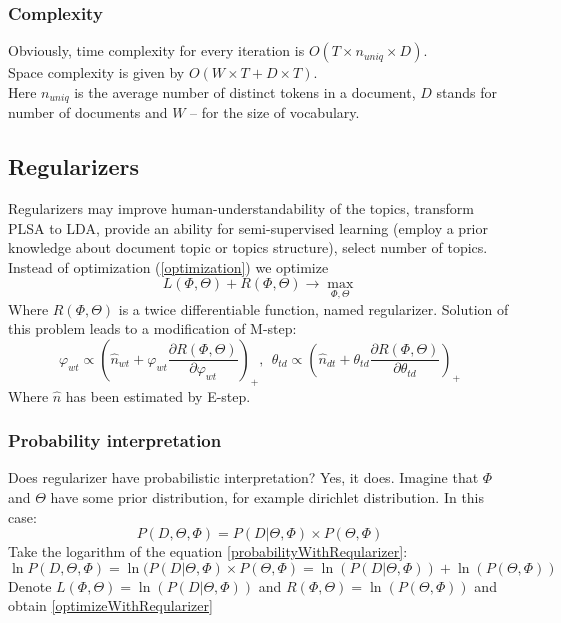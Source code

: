     \subsubsection*{Complexity}
    Obviously, time complexity for every iteration is $O(T \times n_{uniq} \times D)$.\\
    Space complexity is given by $O(W \times T + D \times T)$.\\
    Here $n_{uniq}$ is the average number of distinct tokens in a document, $D$ stands for number of documents and $W$  -- for the size of vocabulary.

\subsection*{Regularizers} \label{Regularizers}
    Regularizers may improve human-understandability of the topics, transform PLSA to LDA, provide an ability
    for semi-supervised learning (employ a prior knowledge about document topic or topics structure), select number of topics.
    Instead of optimization (\ref{optimization}) we optimize
    \begin{equation} \label{optimizeWithReqularizer} L(\Phi, \Theta) + R(\Phi, \Theta) \to \max_{\Phi, \Theta} \end{equation}
    Where $R(\Phi, \Theta)$ is a twice differentiable function, named regularizer.
    Solution of this problem leads to a modification of M\--step:
    \begin{equation}
	\label{RegularizersEquation}
	\varphi_{wt} \propto \left(\hat{n}_{wt} + \varphi_{wt} \frac{\partial  R(\Phi, \Theta)}{\partial \varphi_{wt}} \right)_+ ,\ \
	\theta_{td} \propto \left(\hat{n}_{dt} + \theta_{td}\frac{\partial  R(\Phi, \Theta)}{\partial \theta_{td}} \right)_+
    \end{equation}
    Where $\hat{n}$ has been estimated by E\--step.

    \subsubsection*{Probability interpretation}
	Does regularizer have probabilistic interpretation? Yes, it does. Imagine that $\Phi$ and $\Theta$ have some prior distribution, for example
	dirichlet distribution. In this case:
	\begin{equation} \label{probabilityWithReqularizer} P(D, \Theta, \Phi) = P(D| \Theta, \Phi) \times P(\Theta, \Phi) \end{equation}
	Take the logarithm of the equation \ref{probabilityWithReqularizer}:
	\begin{equation} \ln P(D, \Theta, \Phi) = \ln(P(D| \Theta, \Phi) \times P(\Theta, \Phi) = \ln(P(D| \Theta, \Phi)) + \ln(P(\Theta, \Phi)) \end{equation}
	Denote $L(\Phi, \Theta) = \ln(P(D| \Theta, \Phi))$ and $R(\Phi, \Theta) = \ln(P(\Theta, \Phi))$ and obtain \ref{optimizeWithReqularizer}

